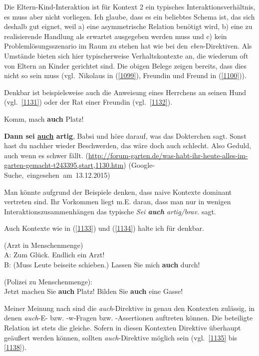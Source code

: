 Die Eltern-Kind-Interaktion ist für Kontext 2 ein typisches Interaktionsverhältnis, es muss aber nicht vorliegen. Ich glaube, dass es ein beliebtes Schema ist, das sich deshalb gut eignet, weil a) eine asymmetrische Relation benötigt wird, b) eine zu realisierende Handlung als erwartet ausgegeben werden muss und c) kein Problemlösungsszenario im Raum zu stehen hat wie bei den \textit{eben}-Direktiven. Als Umstände bieten sich hier typischerweise Verhaltskontexte an, die wiederum oft von Eltern an Kinder gerichtet sind. Die obigen Belege zeigen bereits, dass dies nicht so sein muss (vgl.\ Nikolaus in (\ref{1099}), Freundin und Freund in (\ref{1100})).
 							 
Denkbar ist beispielsweise auch die Anweisung eines Herrchens an seinen Hund (vgl.\ \ref{1131}) oder der Rat einer Freundin (vgl.\ \ref{1132}).
	
\begin{exe}
	\ex\label{1131} 
	Komm, mach \textbf{auch} Platz!
\end{exe}	

\begin{exe}
	\ex\label{1132} 

 	\textbf{Dann sei \ul{auch} artig}, Babsi und höre darauf, was das Dokterchen sagt. Sonst hast du nachher wieder Beschwerden, das wäre doch auch 		schlecht. Also Geduld, auch wenn es schwer fällt.
	\newline
	{\scriptsize(\url{http://forum-garten.de/was-habt-ihr-heute-alles-im-garten-gemacht-t243395,start,1130.htm})}
	\newline
	\hbox{}\hfill\hbox{(Google-Suche, eingesehen am 13.12.2015)}
\end{exe}
Man könnte aufgrund der Beispiele denken, dass naive Kontexte dominant vertreten sind. Ihr Vorkommen liegt m.E. daran, dass man nur in wenigen Interaktions\-zusammenhängen das typische \textit{Sei \textbf{auch} artig/brav.} sagt.

Auch Kontexte wie in (\ref{1133}) und (\ref{1134}) halte ich für denkbar.

\begin{exe}
	\ex\label{1133} 
	(Arzt in Menschenmenge)\\
	A: Zum Glück. Endlich ein Arzt!\\
	B: (Muss Leute beiseite schieben.) Lassen Sie mich \textbf{auch} durch! 
\end{exe}

\begin{exe}
	\ex\label{1134} 
	(Polizei zu Menschenmenge):\\
	Jetzt machen Sie \textbf{auch} Platz! Bilden Sie \textbf{auch} eine Gasse!
\end{exe}	
Meiner Meinung nach sind die \textit{auch}-Direktive in genau den Kontexten zulässig, in denen \textit{auch}-E- bzw. -w-Fragen bzw. -Assertionen auftreten können. Die beteiligte Relation ist stets die gleiche. Sofern in diesen Kontexten Direktive überhaupt geäußert werden können, sollten \textit{auch}-Direktive möglich sein (vgl.\ \ref{1135} bis \ref{1138}).
								
